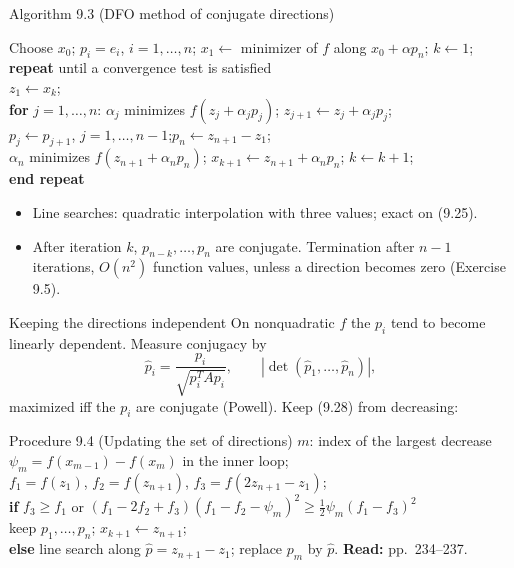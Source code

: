 \documentclass[12pt,aspectratio=169]{beamer}
\newcommand{\readpp}[1]{{\color{red!80!black}\textbf{Read:} #1}}
\newcommand{\algblock}[1]{\begin{block}{}#1\end{block}}
\newcommand{\kw}[1]{\textbf{#1}}
\newcommand{\ind}{\hspace*{1.2em}}
\begin{document}
\begin{frame}{Algorithm 9.3 (DFO method of conjugate directions)}
  \algblock{
    Choose $x_0$; $p_i=e_i$, $i=1,\dots,n$; $x_1\leftarrow$ minimizer of $f$ along $x_0+\alpha p_n$; $k\leftarrow1$;\\
    \kw{repeat} until a convergence test is satisfied\\
    \ind $z_1\leftarrow x_k$;\\
    \ind \kw{for} $j=1,\dots,n$: $\alpha_j$ minimizes $f(z_j+\alpha_jp_j)$; $z_{j+1}\leftarrow z_j+\alpha_jp_j$;\\
    \ind $p_j\leftarrow p_{j+1}$, $j=1,\dots,n-1$;\quad $p_n\leftarrow z_{n+1}-z_1$;\\
    \ind $\alpha_n$ minimizes $f(z_{n+1}+\alpha_np_n)$; $x_{k+1}\leftarrow z_{n+1}+\alpha_np_n$; $k\leftarrow k+1$;\\
    \kw{end repeat}
  }
  \begin{itemize}
    \item Line searches: quadratic interpolation with three values; exact on (9.25).
    \item After iteration $k$, $p_{n-k},\dots,p_n$ are conjugate. Termination after $n-1$ iterations,
      $O(n^2)$ function values, unless a direction becomes zero (Exercise 9.5).
  \end{itemize}
\end{frame}

\begin{frame}{Keeping the directions independent}
  On nonquadratic $f$ the $p_i$ tend to become linearly dependent. Measure conjugacy by
  \begin{equation}
    \hat p_i = \frac{p_i}{\sqrt{p_i^TAp_i}},\qquad |\det(\hat p_1,\dots,\hat p_n)|, \tag{9.27, 9.28}
  \end{equation}
  maximized iff the $p_i$ are conjugate (Powell). Keep (9.28) from decreasing:
  \begin{block}{Procedure 9.4 (Updating the set of directions)}
    $m$: index of the largest decrease $\psi_m=f(x_{m-1})-f(x_m)$ in the inner loop;\\
    $f_1=f(z_1)$, $f_2=f(z_{n+1})$, $f_3=f(2z_{n+1}-z_1)$;\\
    \kw{if} $f_3\ge f_1$ or $(f_1-2f_2+f_3)(f_1-f_2-\psi_m)^2\ge\tfrac12\psi_m(f_1-f_3)^2$\\
    \ind keep $p_1,\dots,p_n$; $x_{k+1}\leftarrow z_{n+1}$;\\
    \kw{else} line search along $\hat p=z_{n+1}-z_1$; replace $p_m$ by $\hat p$. \hfill\readpp{pp.~234--237.}
  \end{block}
\end{frame}
\end{document}
